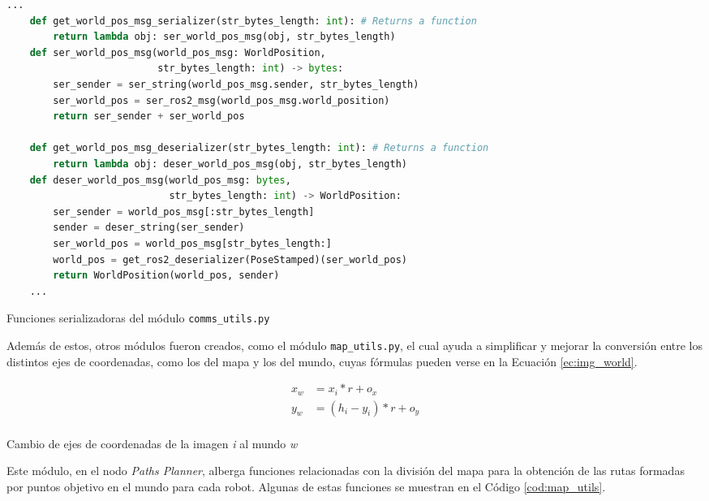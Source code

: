 \begin{code}[h!]
  \begin{lstlisting}[language=Python]
    ...
    def get_world_pos_msg_serializer(str_bytes_length: int): # Returns a function
        return lambda obj: ser_world_pos_msg(obj, str_bytes_length)
    def ser_world_pos_msg(world_pos_msg: WorldPosition,
                          str_bytes_length: int) -> bytes:
        ser_sender = ser_string(world_pos_msg.sender, str_bytes_length)
        ser_world_pos = ser_ros2_msg(world_pos_msg.world_position)
        return ser_sender + ser_world_pos

    def get_world_pos_msg_deserializer(str_bytes_length: int): # Returns a function
        return lambda obj: deser_world_pos_msg(obj, str_bytes_length)
    def deser_world_pos_msg(world_pos_msg: bytes,
                            str_bytes_length: int) -> WorldPosition:
        ser_sender = world_pos_msg[:str_bytes_length]
        sender = deser_string(ser_sender)
        ser_world_pos = world_pos_msg[str_bytes_length:]
        world_pos = get_ros2_deserializer(PoseStamped)(ser_world_pos)
        return WorldPosition(world_pos, sender)
    ...
  \end{lstlisting}
\caption[Funciones serializadoras del módulo \texttt{comms\_utils.py}]{Funciones serializadoras del módulo \texttt{comms\_utils.py}}
\label{cod:comms_utils}
\end{code}

Además de estos, otros módulos fueron creados, como el módulo
\texttt{map\_utils.py}, el cual ayuda a simplificar y mejorar la conversión
entre los distintos ejes de coordenadas, como los del mapa y los del mundo,
cuyas fórmulas pueden verse en la Ecuación \ref{ec:img_world}.
\\

\begin{myequation}[h!]
  \begin{equation}
  \begin{aligned}
  x_w &= x_i * r + o_x  \\
  y_w &= (h_i - y_i) * r + o_y  \\
  \end{aligned}
  \label{ec:img_world}
  \end{equation}
  \caption[Cambio de ejes de coordenadas de la imagen \textit{i} al mundo \textit{w}]{Cambio de ejes de coordenadas de la imagen \textit{i} al mundo \textit{w}}
\end{myequation}

Este módulo, en el nodo \textit{Paths Planner}, alberga funciones relacionadas
con la división del mapa para la obtención de las rutas formadas por puntos
objetivo en el mundo para cada robot.
Algunas de estas funciones se muestran en el Código \ref{cod:map_utils}.
\\

